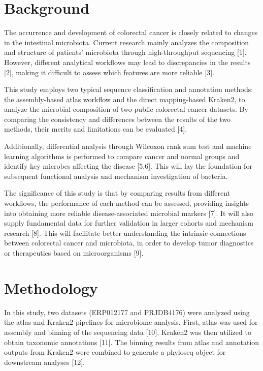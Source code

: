 \documentclass[
]{article}
\author{YNYK}
\date{2023-10-08}
\begin{document}
\fontsize{18}{12}\selectfont

\hypertarget{background}{%
\section{Background}\label{background}}

The occurrence and development of colorectal cancer is closely related
to changes in the intestinal microbiota. Current research mainly
analyzes the composition and structure of patients' microbiota through
high-throughput sequencing {[}1{]}. However, different analytical
workflows may lead to discrepancies in the results {[}2{]}, making it
difficult to assess which features are more reliable {[}3{]}.

This study employs two typical sequence classification and annotation
methods: the assembly-based atlas workflow and the direct mapping-based
Kraken2, to analyze the microbial composition of two public colorectal
cancer datasets. By comparing the consistency and differences between
the results of the two methods, their merits and limitations can be
evaluated {[}4{]}.

Additionally, differential analysis through Wilcoxon rank sum test and
machine learning algorithms is performed to compare cancer and normal
groups and identify key microbes affecting the disease {[}5,6{]}. This
will lay the foundation for subsequent functional analysis and mechanism
investigation of bacteria.

The significance of this study is that by comparing results from
different workflows, the performance of each method can be assessed,
providing insights into obtaining more reliable disease-associated
microbial markers {[}7{]}. It will also supply fundamental data for
further validation in larger cohorts and mechanism research {[}8{]}.
This will facilitate better understanding the intrinsic connections
between colorectal cancer and microbiota, in order to develop tumor
diagnostics or therapeutics based on microorganisms {[}9{]}.

\hypertarget{methodology}{%
\section{Methodology}\label{methodology}}

In this study, two datasets (ERP012177 and PRJDB4176) were analyzed
using the atlas and Kraken2 pipelines for microbiome analysis. First,
atlas was used for assembly and binning of the sequencing data {[}10{]}.
Kraken2 was then utilized to obtain taxonomic annotations {[}11{]}. The
binning results from atlas and annotation outputs from Kraken2 were
combined to generate a phyloseq object for downstream analyses {[}12{]}.
\end{document}
